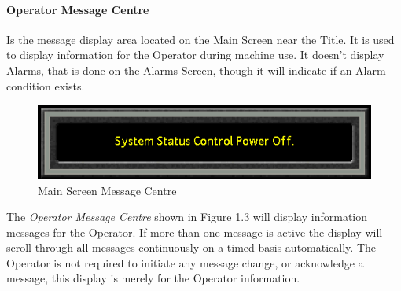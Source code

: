 \paragraph{Operator Message Centre}
Is the message display area located on the Main Screen near the Title. It is used to display information for the Operator during machine use. It doesn't display Alarms, that is done on the Alarms Screen, though it will indicate if an Alarm condition exists.
\begin{figure}
	\centering
	\includegraphics[width=.5\linewidth]{screen-captures/message-centre}
	\caption{Main Screen Message Centre}
	\label{fig:main-msg-cntr}
\end{figure}
The \textit{Operator Message Centre} shown in Figure 1.3 will display information messages for the Operator. If more than one message is active the display will scroll through all messages continuously on a timed basis automatically. The Operator is not required to initiate any message change, or acknowledge a message, this display is merely for the Operator information.
\\
\\
\\
\\
\\
\\
\\
\\
\\
\\
\\
\\
\\
\\
\\
\pagebreak

